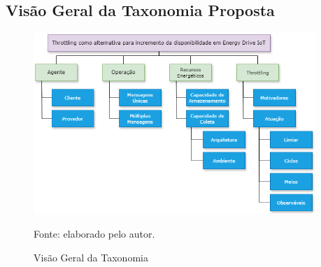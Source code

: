 \begin{anexosenv}

\partanexos

\chapter{Visão Geral da Taxonomia Proposta}
\label{anexo:anexo_mapa}
\begin{figure}
	\centering
	\caption{Visão Geral da Taxonomia}
	\label{fig:divisaobasetaxonomia}
	\includegraphics[width=0.95\textwidth]{Imagens/anexos/anexo_visaogeraltaxonomia.png}	
	
	Fonte: elaborado pelo autor.
\end{figure}

\end{anexosenv}
